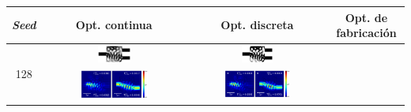 \begin{landscape}
\begin{table}[ht]
    \centering
    \vspace*{-2.5cm}
    \hspace*{-5cm}
    \begin{tabular}{|c|c|c|c|}
    \hline 
    \emph{Seed} & Opt. continua & Opt. discreta &  Opt. de fabricación \\
    \hline
      \multirow{2}{*}{128} &
      \includegraphics[width=0.24\textwidth]{image/results/wdm/GA/visualize_eps_cont_128.png} &
      \includegraphics[width=0.24\textwidth]{image/results/wdm/GA/visualize_eps_disc_128.png} \\
      \cline{2-4}
      &
      \includegraphics[width=0.50\textwidth]{image/results/wdm/GA/visualize_field_cont_128.png} &
      \includegraphics[width=0.50\textwidth]{image/results/wdm/GA/visualize_field_disc_128.png} \\

\end{tabular}
\end{table}
\end{landscape}
